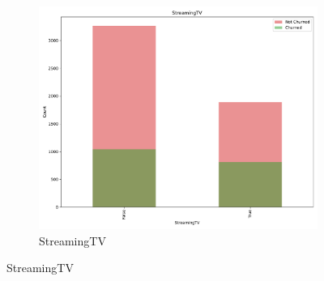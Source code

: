 \documentclass[a4paper,11pt]{article}
\begin{document}
\begin{landscape}
\begin{figure}
\begin{subfigure}{0.14\linewidth}
        \includegraphics[width=\linewidth]{figures/understanding/StreamingTV.pdf}
        \caption{StreamingTV}
    \end{subfigure}
    

\end{figure}
\end{landscape}
\end{document}
